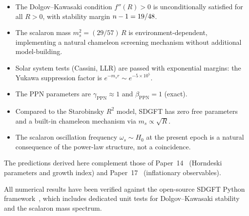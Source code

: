 \documentclass[amsmath,amssymb,aps,prd,twocolumn,superscriptaddress,nofootinbib]{revtex4-2}
\begin{document}
\begin{itemize}
  \item The Dolgov--Kawasaki condition $f''(R) > 0$ is
    unconditionally satisfied for all $R > 0$, with stability
    margin $n - 1 = 19/48$.

  \item The scalaron mass
    $m_s^2 = (29/57)\,R$ is environment-dependent, implementing
    a natural chameleon screening mechanism without additional
    model-building.

  \item Solar system tests (Cassini, LLR) are passed with
    exponential margins: the Yukawa suppression factor is
    $e^{-m_s r} \sim e^{-5 \times 10^5}$.

  \item The PPN parameters are $\gamma_{\mathrm{PPN}} \approx 1$
    and $\beta_{\mathrm{PPN}} = 1$ (exact).

  \item Compared to the Starobinsky $R^2$ model, SDGFT has zero
    free parameters and a built-in chameleon mechanism via
    $m_s \propto \sqrt{R}$.

  \item The scalaron oscillation frequency $\omega_s \sim H_0$
    at the present epoch is a natural consequence of the
    power-law structure, not a coincidence.
\end{itemize}

The predictions derived here complement those of
Paper~14~\cite{Besemer_Paper14} (Horndeski parameters and growth
index) and Paper~17~\cite{Besemer_Paper17} (inflationary
observables).

\begin{acknowledgments}
All numerical results have been verified against the open-source
SDGFT Python framework~\cite{Besemer_Code}, which includes
dedicated unit tests for Dolgov--Kawasaki stability and the
scalaron mass spectrum.
\end{acknowledgments}

\end{document}
